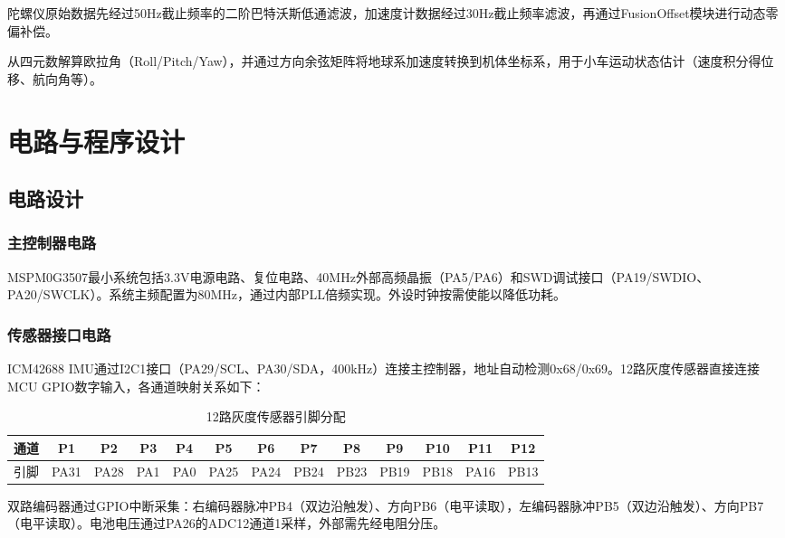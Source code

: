 \documentclass[12pt,a4paper]{ctexart}
\begin{document}
陀螺仪原始数据先经过50Hz截止频率的二阶巴特沃斯低通滤波，加速度计数据经过30Hz截止频率滤波，再通过FusionOffset模块进行动态零偏补偿。

从四元数解算欧拉角（Roll/Pitch/Yaw），并通过方向余弦矩阵将地球系加速度转换到机体坐标系，用于小车运动状态估计（速度积分得位移、航向角等）。

\section{电路与程序设计}

\subsection{电路设计}

\subsubsection{主控制器电路}

MSPM0G3507最小系统包括3.3V电源电路、复位电路、40MHz外部高频晶振（PA5/PA6）和SWD调试接口（PA19/SWDIO、PA20/SWCLK）。系统主频配置为80MHz，通过内部PLL倍频实现。外设时钟按需使能以降低功耗。

\subsubsection{传感器接口电路}

ICM42688 IMU通过I2C1接口（PA29/SCL、PA30/SDA，400kHz）连接主控制器，地址自动检测0x68/0x69。12路灰度传感器直接连接MCU GPIO数字输入，各通道映射关系如下：

\begin{table}[H]
    \centering
    \footnotesize
    \caption{12路灰度传感器引脚分配}
    \label{tab:gray_pins}
    \begin{tabular}{|c|c|c|c|c|c|c|c|c|c|c|c|c|}
        \hline
        通道 & P1 & P2 & P3 & P4 & P5 & P6 & P7 & P8 & P9 & P10 & P11 & P12 \\
        \hline
        引脚 & PA31 & PA28 & PA1 & PA0 & PA25 & PA24 & PB24 & PB23 & PB19 & PB18 & PA16 & PB13 \\
        \hline
    \end{tabular}
\end{table}

双路编码器通过GPIO中断采集：右编码器脉冲PB4（双边沿触发）、方向PB6（电平读取），左编码器脉冲PB5（双边沿触发）、方向PB7（电平读取）。电池电压通过PA26的ADC12通道1采样，外部需先经电阻分压。
\end{document}
